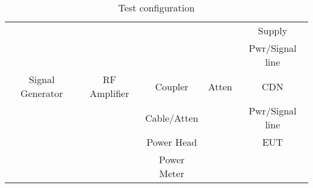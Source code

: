 \begin{table}[h!]
\centering
\begin{tabular}{||c c c c c||}
\hline
& & & & Supply \\
& & & & Pwr/Signal line \\
Signal Generator & RF Amplifier & Coupler & Atten & CDN \\
& & Cable/Atten & & Pwr/Signal line \\
& & Power Head & & EUT \\
& & Power Meter & & \\
\hline
\end{tabular}
\caption{Test configuration}
\label{table:3}
\end{table}
